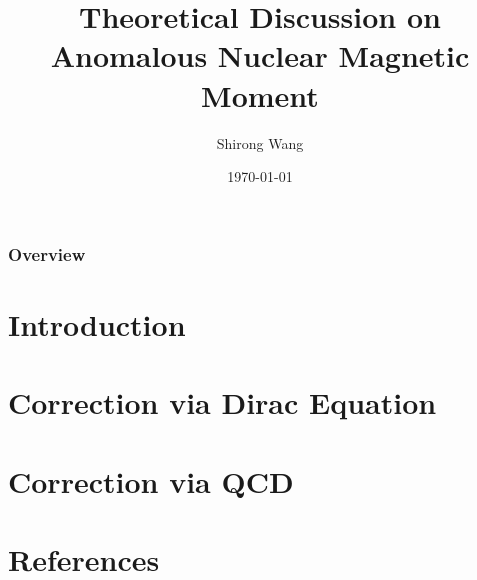 \documentclass[xcolor=table]{beamer}
\title[]{Theoretical Discussion on\\
	 Anomalous Nuclear Magnetic Moment} %
\author{Shirong Wang} %
\institute[] %
{Kuang Yaming Honors School\\
\medskip
\textit{} %
}
\date{\today} %
\numberwithin{equation}{section}
\begin{document}
\begin{frame}
\titlepage %
\end{frame}

\begin{frame}
\frametitle{Overview} %
\tableofcontents %
\end{frame}


\section{Introduction}

\section{Correction via Dirac Equation}

\section{Correction via QCD}


\section{References}

%
%
\end{document}
